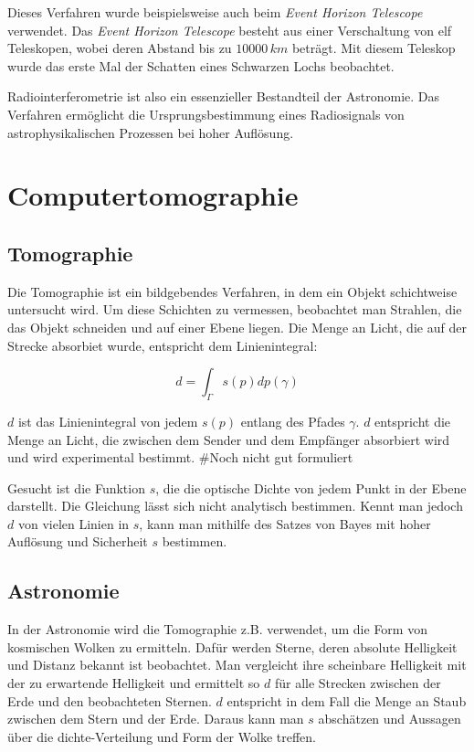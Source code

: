 \documentclass[]{dsadokumentation}
\begin{document}
Dieses Verfahren wurde beispielsweise auch beim \emph{Event Horizon Telescope} verwendet. Das \emph{Event Horizon Telescope} besteht aus einer Verschaltung von elf Teleskopen, wobei deren Abstand bis zu $10000\,km$ beträgt. Mit diesem Teleskop wurde das erste Mal der Schatten eines Schwarzen Lochs beobachtet.

Radiointerferometrie ist also ein essenzieller Bestandteil der Astronomie. Das Verfahren ermöglicht die Ursprungsbestimmung eines Radiosignals von astrophysikalischen Prozessen bei hoher Auflösung.




\section{Computertomographie}\label{k4.2.comptomo.ct}
\subsection{Tomographie}

Die Tomographie ist ein bildgebendes Verfahren, in dem ein Objekt schichtweise untersucht wird. Um diese Schichten zu vermessen, beobachtet man Strahlen, die das Objekt schneiden und auf einer Ebene liegen. Die Menge an Licht, die auf der Strecke absorbiet wurde, entspricht dem Linienintegral:

$$d=\int_{\Gamma}{}s(p)dp(\gamma)$$

$d$ ist das Linienintegral von jedem $s(p)$ entlang des Pfades $\gamma$. $d$ entspricht die Menge an Licht, die zwischen dem Sender und dem Empfänger absorbiert wird und wird experimental bestimmt. \#Noch nicht gut formuliert%

Gesucht ist die Funktion $s$, die die optische Dichte von jedem Punkt in der Ebene darstellt. Die Gleichung lässt sich nicht analytisch bestimmen. Kennt man jedoch $d$ von vielen Linien in $s$, kann man mithilfe des Satzes von Bayes mit hoher Auflösung und Sicherheit $s$ bestimmen.

\subsection{Astronomie}

In der Astronomie wird die Tomographie z.B. verwendet, um die Form von kosmischen Wolken zu ermitteln. Dafür werden Sterne, deren absolute Helligkeit und Distanz bekannt ist beobachtet. Man vergleicht ihre scheinbare Helligkeit mit der zu erwartende Helligkeit und ermittelt so $d$ für alle Strecken zwischen der Erde und den beobachteten Sternen. $d$ entspricht in dem Fall die Menge an Staub zwischen dem Stern und der Erde. Daraus kann man $s$ abschätzen und Aussagen über die dichte-Verteilung und Form der Wolke treffen.
\end{document}
